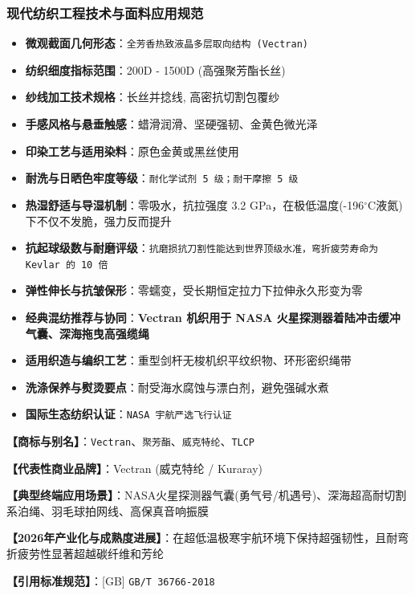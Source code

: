\documentclass[11pt,openright,twoside,UTF8]{ctexbook}
\begin{document}
\subsubsection*{现代纺织工程技术与面料应用规范}
\begin{itemize} \setlength{\itemsep}{2pt}
    \item \textbf{微观截面几何形态}：\texttt{全芳香热致液晶多层取向结构 (Vectran)}
    \item \textbf{纺织细度指标范围}：200D - 1500D (高强聚芳酯长丝)
    \item \textbf{纱线加工技术规格}：长丝并捻线, 高密抗切割包覆纱
    \item \textbf{手感风格与悬垂触感}：蜡滑润滑、坚硬强韧、金黄色微光泽
    \item \textbf{印染工艺与适用染料}：原色金黄或黑丝使用
    \item \textbf{耐洗与日晒色牢度等级}：\texttt{耐化学试剂 5 级；耐干摩擦 5 级}
    \item \textbf{热湿舒适与导湿机制}：零吸水，抗拉强度 3.2 GPa，在极低温度(-196$^\circ\mathrm{C}$液氮)下不仅不发脆，强力反而提升
    \item \textbf{抗起球级数与耐磨评级}：\texttt{抗磨损抗刀割性能达到世界顶级水准，弯折疲劳寿命为 Kevlar 的 10 倍}
    \item \textbf{弹性伸长与抗皱保形}：零蠕变，受长期恒定拉力下拉伸永久形变为零
    \item \textbf{经典混纺推荐与协同}：\textbf{Vectran 机织用于 NASA 火星探测器着陆冲击缓冲气囊、深海拖曳高强缆绳}
    \item \textbf{适用织造与编织工艺}：重型剑杆无梭机织平纹织物、环形密织绳带
    \item \textbf{洗涤保养与熨烫要点}：耐受海水腐蚀与漂白剂，避免强碱水煮
    \item \textbf{国际生态纺织认证}：\texttt{NASA 宇航严选飞行认证}
\end{itemize}
\vspace{0.2cm}

\noindent\textbf{【商标与别名】}：\texttt{Vectran}、\texttt{聚芳酯}、\texttt{威克特纶}、\texttt{TLCP}\par
\noindent\textbf{【代表性商业品牌】}：Vectran (威克特纶 / Kuraray)\par
\noindent\textbf{【典型终端应用场景】}：NASA火星探测器气囊(勇气号/机遇号)、深海超高耐切割系泊绳、羽毛球拍网线、高保真音响振膜\par
\noindent\textbf{【2026年产业化与成熟度进展】}：在超低温极寒宇航环境下保持超强韧性，且耐弯折疲劳性显著超越碳纤维和芳纶\par
\noindent\textbf{【引用标准规范】}：[GB] \texttt{GB/T 36766-2018}\par
\vspace{0.5cm}
\end{document}
